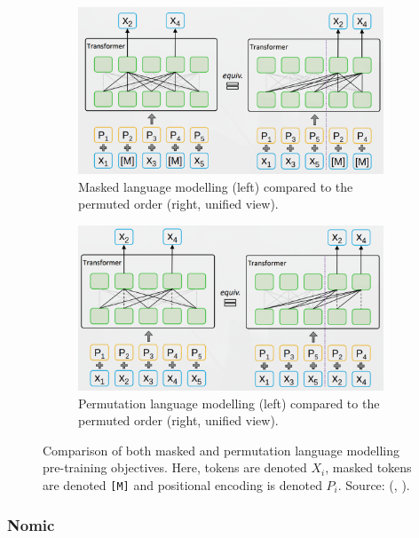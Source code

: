 \documentclass[10pt,oneside]{report}
\renewcommand{\citet}[1]{\citeauthor{#1}, \citeyear{#1}}
\begin{document}
\begin{figure}[htbp]
    \centering
    \begin{subfigure}[b]{0.493\textwidth}
        \centering
        \includegraphics[width=\textwidth]{MPNetMLM.png}
        \caption{Masked language modelling (left) compared to the permuted order (right, unified view).}
        \label{fig:MPNetMLM}
    \end{subfigure}%
    \hfill
    \begin{subfigure}[b]{0.455\textwidth}
        \centering
        \includegraphics[width=\textwidth]{MPNetPLM.png}
        \caption{Permutation language modelling (left) compared to the permuted order (right, unified view).}
        \label{fig:MPNetPLM}
    \end{subfigure}
    \caption{Comparison of both masked and permutation language modelling pre-training objectives. Here, tokens are denoted $X_i$, masked tokens are denoted \texttt{[M]} and positional encoding is denoted $P_i$. Source: (\citet{song2020mpnet}).}
    \label{fig:mpnet}
\end{figure}


\subsubsection{Nomic}\label{sec:nomic}
\end{document}
